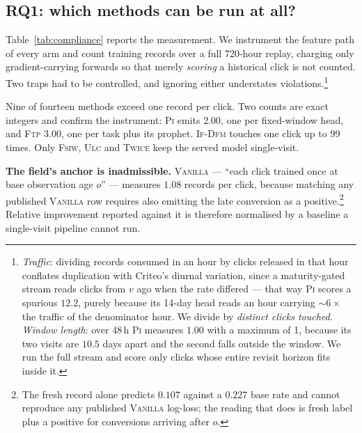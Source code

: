 \documentclass[runningheads]{llncs}
\begin{document}
\subsection{RQ1: which methods can be run at all?}\label{sec:audit}

\begin{table}[t]
\caption{Training records per click, measured over a full 720-hour replay at $v=7$\,d. Counts are
per \emph{distinct click touched}, so traffic variation cannot inflate them, and the window covers
every method's longest revisit lag. $^{\dag}$\textsc{Twice}'s served tower is single-visit; its
delay head reads the conversion clock}
\label{tab:compliance}
\centering\small

\end{table}


Table~\ref{tab:compliance} reports the measurement. We instrument the
feature path of every arm and count training records over a full 720-hour replay, charging only
gradient-carrying forwards so that merely \emph{scoring} a historical click is not counted. Two traps had to be
controlled, and ignoring either understates violations.\footnote{\emph{Traffic}: dividing records
consumed in an hour by clicks released in that hour conflates duplication with Criteo's diurnal
variation, since a maturity-gated stream reads clicks from $v$ ago when the rate differed --- that
way \textsc{Pi} scores a spurious $12.2$, purely because its 14-day head reads an hour carrying
${\sim}6\times$ the traffic of the denominator hour. We divide by \emph{distinct clicks touched}.
\emph{Window length}: over 48\,h \textsc{Pi} measures $1.00$ with a maximum of 1, because its two
visits are $10.5$ days apart and the second falls outside the window. We run the full stream and
score only clicks whose entire revisit horizon fits inside it.}

Nine of fourteen methods exceed one record per click. Two counts are exact integers and confirm the
instrument: \textsc{Pi} emits $2.00$, one per fixed-window head, and \textsc{Ftp} $3.00$, one per
task plus its prophet. \textsc{If-Dfm} touches one click up to 99 times. Only \textsc{Fsiw},
\textsc{Ulc} and \textsc{Twice} keep the served model single-visit.

\smallskip\noindent\textbf{The field's anchor is inadmissible.} \textsc{Vanilla} --- ``each click
trained once at base observation age $o$'' --- measures $1.08$ records per click, because matching
any published \textsc{Vanilla} row requires also emitting the late conversion as a
positive.\footnote{The fresh record alone predicts $0.107$ against a $0.227$ base rate and cannot
reproduce any published \textsc{Vanilla} log-loss; the reading that does is fresh label plus a
positive for conversions arriving after $o$.} Relative improvement reported against it is therefore
normalised by a baseline a single-visit pipeline cannot run.
\end{document}
